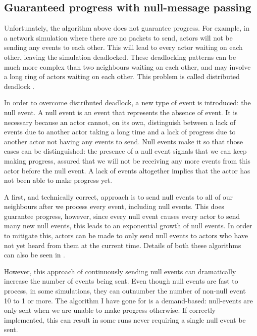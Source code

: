 \subsection{Guaranteed progress with null-message passing} \label{null-messages}

Unfortunately, the algorithm above does not guarantee progress\cite{misra_distributed_1986}.
For example, in a network simulation where there are no packets to send, actors will not be sending any events to each other.
This will lead to every actor waiting on each other, leaving the simulation deadlocked.
These deadlocking patterns can be much more complex than two neighbours waiting on each other, and may involve a long ring of actors waiting on each other.
This problem is called distributed deadlock \cite{misra_distributed_1986}.

In order to overcome distributed deadlock, a new type of event is introduced: the null event.
A null event is an event that represents the absence of event.
It is necessary because an actor cannot, on its own, distinguish between a lack of events due to another actor taking a long time and a lack of progress due to another actor not having any events to send.
Null events make it so that those cases can be distinguished: the presence of a null event signals that we can keep making progress, assured that we will not be receiving any more events from this actor before the null event.
A lack of events altogether implies that the actor has not been able to make progress yet.

A first, and technically correct, approach is to send null events to all of our neighbours after we process every event, including null events.
This does guarantee progress, however, since every null event causes every actor to send many new null events, this leads to an exponential growth of null events.
In order to mitigate this, actors can be made to only send null events to actors who have not yet heard from them at the current time.
Details of both these algorithms can also be seen in \cite{misra_distributed_1986}.

However, this approach of continuously sending null events can dramatically increase the number of events being sent.
Even though null events are fast to process, in some simulations, they can outnumber the number of non-null event 10 to 1 or more.
The algorithm I have gone for is a demand-based: null-events are only sent when we are unable to make progress otherwise.
If correctly implemented, this can result in some runs never requiring a single null event be sent.

